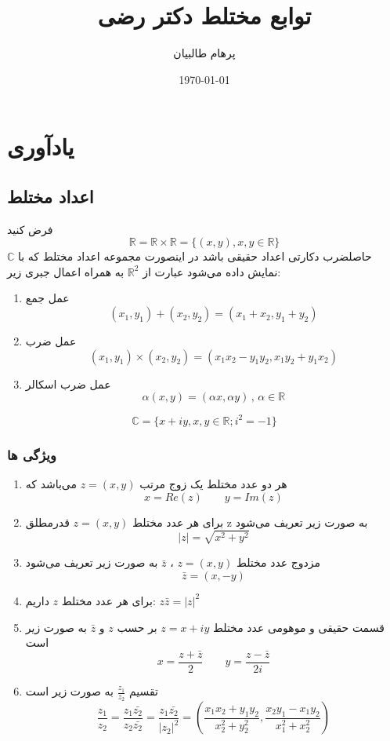 \documentclass[12pt]{report}
\begin{document}
	
	
	\title{توابع مختلط دکتر رضی}
	\author{پرهام طالبیان}
	\date{\today}
	\maketitle
	
	

	\tableofcontents
	\chapter{یادآوری}
	
	\section{اعداد مختلط}
	فرض کنید
	$$\mathbb{R} = \mathbb{R} \times \mathbb{R} = \{(x, y), x, y \in \mathbb{R}\}$$
	حاصلضرب دکارتی اعداد حقیقی باشد در اینصورت مجموعه اعداد مختلط که با
	$\mathbb{C}$
	نمایش داده می‌شود عبارت از 
	$\mathbb{R}^2$
	به همراه اعمال جبری زیر:
	\begin{enumerate}
		\item 
		عمل جمع
		$$(x_1,y_1) + (x_2,y_2) = (x_1+x_2, y_1+y_2)$$
		\item
		عمل ضرب
		$$(x_1,y_1) \times (x_2,y_2) = (x_1x_2 - y_1 y_2, x_1y_2+y_1x_2)$$
		\item
		عمل ضرب اسکالر
		$$\alpha(x, y) = (\alpha x , \alpha y) \,,\, \alpha \in \mathbb{R}$$

	\end{enumerate}
	
	$$\mathbb{C} = \{x+iy, x, y \in \mathbb{R} ; i^2 = -1\}$$
	\subsection{ویژگی ها}
	\begin{enumerate}
		\item 
		هر دو عدد مختلط یک زوج مرتب 
		$z=(x, y)$
		می‌باشد که
		$$x = Re(z) \qquad y = Im(z)$$
		\item
		برای هر عدد مختلط
		$z = (x, y)$
		قدرمطلق z به صورت زیر تعریف می‌شود
		$$|z| = \sqrt{x^2+y^2}$$
		\item
		مزدوج عدد مختلط 
		$z=(x, y)$
		،
		$\bar{z}$
		به صورت زیر تعریف می‌شود
		$$\bar{z} =(x, -y)$$
		\item
		برای هر عدد مختلط  
		$z$
		داریم:
		$z \bar{z} = |z|^2\qquad$
		\item
		قسمت حقیقی و موهومی عدد مختلط
		$z = x+iy$
		بر حسب 
		$z$
		و
		$\bar{z}$
		به صورت زیر است
		$$x=\frac{z+\bar{z}}{2} \qquad y=\frac{z - \bar{z}}{2i}$$
		\item
		تقسیم
		$\frac{z_1}{z_2}$
		به صورت زیر است
		$$\frac{z_1}{z_2} = \frac{z_1\bar{z_2}}{z_2\bar{z_2}} = \frac{z_1\bar{z_2}}{|z_2|^2} = (\frac{x_1x_2+y_1y_2}{x_2^2+y_2^2}, \frac{x_2y_1 - x_1y_2}{x_1^2+x_2^2})$$
	\end{enumerate}
	
\end{document}
